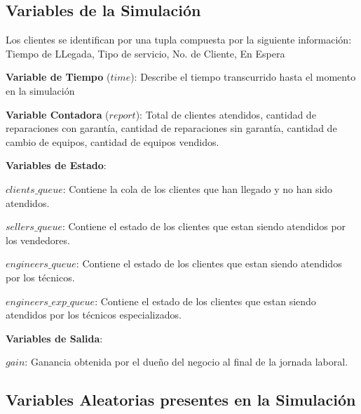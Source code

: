 \documentclass[a4paper,10pt,twocolumn]{article}
\begin{document}
	\subsection{Variables de la Simulaci\'on}\label{sub:results}
	
	Los clientes se identifican por una tupla compuesta por la siguiente información: \\ 
	Tiempo de LLegada, Tipo de servicio, No. de Cliente, En Espera

	\begin{description}
		\item \textbf{Variable de Tiempo} ($time$): Describe el tiempo transcurrido hasta el momento en la simulación
		\item \textbf{Variable Contadora} ($report$): Total de clientes atendidos, cantidad de reparaciones con garantía, cantidad de reparaciones sin garantía, cantidad de cambio de equipos, cantidad de equipos vendidos.
		\item \textbf{Variables de Estado}:
		\begin{description}
			\item $clients\_queue$: Contiene la cola de los clientes que han llegado y no han sido atendidos.
			\item $sellers\_queue$: Contiene el estado de los clientes que estan siendo atendidos por los vendedores.
			\item $engineers\_queue$: Contiene el estado de los clientes que estan siendo atendidos por los técnicos.
			\item $engineers\_exp\_queue$: Contiene el estado de los clientes que estan siendo atendidos por los técnicos especializados.
			
		\end{description}
		\item \textbf{Variables de Salida}:
		\begin{description}
			\item $gain$: Ganancia obtenida por el dueño del negocio al final de la jornada laboral.
		\end{description}
	\end{description}
	\subsection{Variables Aleatorias presentes en la Simulación}\label{sub:lists}
		
\end{document}
